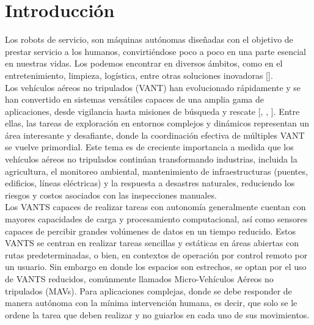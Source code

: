 \documentclass[sigconf]{acmart}
\begin{document}

\maketitle

\section{Introducción}

Los robots de servicio, son máquinas autónomas diseñadas con el objetivo de prestar servicio a los humanos, convirtiéndose poco a poco en una parte esencial en nuestras vidas. Los podemos encontrar en diversos ámbitos, como en el entretenimiento, limpieza, logística, entre otras soluciones inovadoras [].\\

Los vehículos aéreos no tripulados (VANT) han evolucionado rápidamente y se han convertido en sistemas versátiles capaces de una amplia gama de aplicaciones, desde vigilancia hasta misiones de búsqueda y rescate [, , ]. Entre ellas, las tareas de exploración en entornos complejos y dinámicos representan un área interesante y desafiante, donde la coordinación efectiva de múltiples VANT se vuelve primordial. Este tema es de creciente importancia a medida que los vehículos aéreos no tripulados continúan transformando industrias, incluida la agricultura, el monitoreo ambiental, mantenimiento de infraestructuras (puentes, edificios, líneas eléctricas) y la respuesta a desastres naturales, reduciendo los riesgos y costos asociados con las inspecciones manuales.\\

Los VANTS capaces de realizar tareas con autonomía generalmente cuentan con mayores capacidades de carga y procesamiento computacional, así como sensores capaces de percibir grandes volúmenes de datos en un tiempo reducido. Estos VANTS se centran en realizar tareas sencillas y estáticas en áreas abiertas con rutas predeterminadas, o bien, en contextos de operación por control remoto por un usuario. Sin embargo en donde los espacios son estrechos, se optan por el uso de VANTS reducidos, comúnmente llamados Micro-Vehículos Aéreos no tripulados (MAVs). Para aplicaciones complejas, donde se debe responder de manera autónoma con la mínima intervención humana, es decir, que solo se le ordene la tarea que deben realizar y no guiarlos en cada uno de sus movimientos.\\
\end{document}
